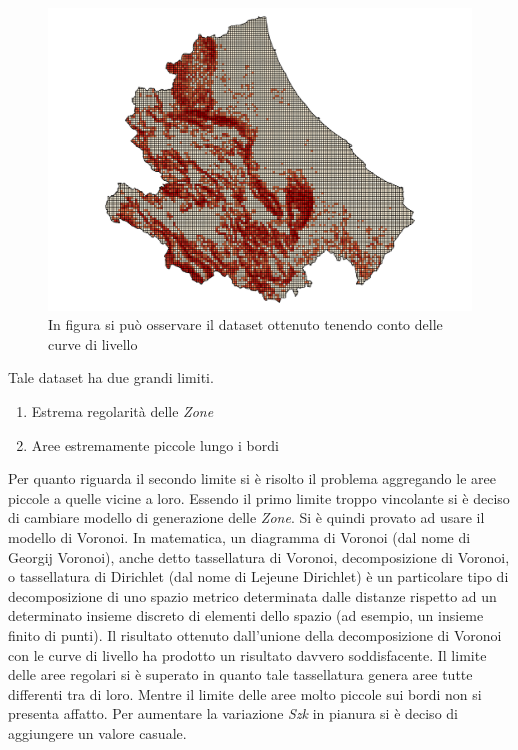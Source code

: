 \begin{figure}[h]
	\centering
	\includegraphics[width=1\textwidth]{images/abruzzoZKquadretto.png}
	\caption{In figura si può osservare il dataset ottenuto tenendo conto delle curve di livello}
	\label{fig:diagrammaER}
\end{figure}
Tale dataset ha due grandi limiti.
\begin{enumerate}
	\item Estrema regolarità delle \textit{Zone}
	\item Aree estremamente piccole lungo i bordi
\end{enumerate}
Per quanto riguarda il secondo limite si è risolto il problema aggregando le aree piccole a quelle vicine a loro. Essendo il primo limite troppo vincolante si è deciso di cambiare modello di generazione delle \textit{Zone}. Si è quindi provato ad usare il modello di Voronoi. In matematica, un diagramma di Voronoi (dal nome di Georgij Voronoi), anche detto tassellatura di Voronoi, decomposizione di Voronoi, o tassellatura di Dirichlet (dal nome di Lejeune Dirichlet) è un particolare tipo di decomposizione di uno spazio metrico determinata dalle distanze rispetto ad un determinato insieme discreto di elementi dello spazio (ad esempio, un insieme finito di punti). Il risultato ottenuto dall'unione della decomposizione di Voronoi con le curve di livello ha prodotto un risultato davvero soddisfacente. Il limite delle aree regolari si è superato in quanto tale tassellatura genera aree tutte differenti tra di loro. Mentre il limite delle aree molto piccole sui bordi non si presenta affatto.
Per aumentare la variazione \textit{Szk}  in pianura si è deciso di aggiungere un valore casuale.
